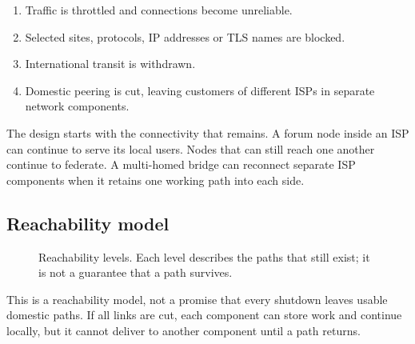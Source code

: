 \documentclass[12pt,a4paper]{article}
\begin{document}
\begin{enumerate}
\item Traffic is throttled and connections become unreliable.


\item Selected sites, protocols, IP addresses or TLS names are blocked.


\item International transit is withdrawn.


\item Domestic peering is cut, leaving customers of different ISPs in separate network components.


\end{enumerate}
The design starts with the connectivity that remains. A forum node inside an ISP can continue to serve its local users. Nodes that can still reach one another continue to federate. A multi-homed bridge can reconnect separate ISP components when it retains one working path into each side.

\subsection*{Reachability model}

\begin{figure}[H]\centering
{}
\caption{Reachability levels. Each level describes the paths that still exist; it is not a guarantee that a path survives.}
\end{figure}
This is a reachability model, not a promise that every shutdown leaves usable domestic paths. If all links are cut, each component can store work and continue locally, but it cannot deliver to another component until a path returns.
\end{document}

